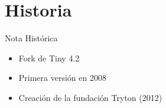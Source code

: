 

\section{Historia}

	\begin{frame}{Nota Histórica}
		\begin{itemize}
			\item Fork de Tiny 4.2
			\item Primera versión en 2008	
			\item Creación de la fundación Tryton (2012)
		\end{itemize}
    \end{frame}
